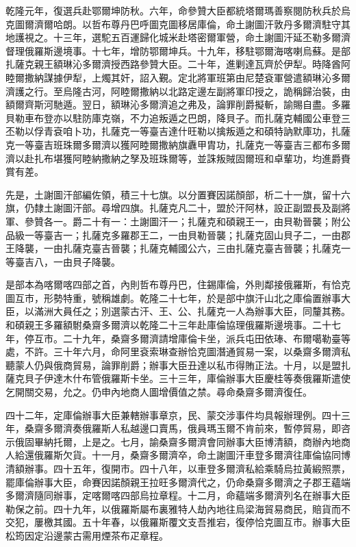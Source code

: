 \begin{pinyinscope}
乾隆元年，復選兵赴鄂爾坤防秋。六年，命參贊大臣都統塔爾瑪善察閱防秋兵於烏克圖爾濟爾哈朗。以哲布尊丹巴呼圖克圖移居庫倫，命土謝圖汗敦丹多爾濟駐守其地護視之。十三年，選駝五百運歸化城米赴塔密爾軍營，命土謝圖汗延丕勒多爾濟督理俄羅斯邊境事。十七年，增防鄂爾坤兵。十九年，移駐鄂爾海喀喇烏蘇。是部扎薩克親王額琳沁多爾濟授西路參贊大臣。二十年，進剿達瓦齊於伊犁。時降酋阿睦爾撒納謀據伊犁，上燭其奸，詔入覲。定北將軍班第由尼楚袞軍營遣額琳沁多爾濟護之行。至烏隆古河，阿睦爾撒納以北路定邊左副將軍印授之，詭稱歸治裝，由額爾齊斯河馳遁。翌日，額琳沁多爾濟追之弗及，論罪削爵擬斬，諭賜自盡。多羅貝勒車布登亦以駐防庫克嶺，不力追叛遁之巴朗，降貝子。而扎薩克輔國公車登三丕勒以俘青袞咱卜功，扎薩克一等臺吉達什旺勒以擒叛遁之和碩特訥默庫功，扎薩克一等臺吉班珠爾多爾濟以獲阿睦爾撒納旗纛甲胄功，扎薩克一等臺吉三都布多爾濟以赴扎布堪獲阿睦納撒納之孥及班珠爾等，並誅叛賊固爾班和卓輩功，均進爵賚賞有差。

先是，土謝圖汗部編佐領，積三十七旗。以分置賽因諾顏部，析二十一旗，留十六旗，仍隸土謝圖汗部。尋增四旗。扎薩克凡二十，盟於汗阿林，設正副盟長及副將軍、參贊各一。爵二十有一：土謝圖汗一；扎薩克和碩親王一，由貝勒晉襲；附公品級一等臺吉一；扎薩克多羅郡王二，一由貝勒晉襲；扎薩克固山貝子二，一由郡王降襲，一由扎薩克臺吉晉襲；扎薩克輔國公六，三由扎薩克臺吉晉襲；扎薩克一等臺吉八，一由貝子降襲。

是部本為喀爾喀四部之首，內則哲布尊丹巴，住錫庫倫，外則鄰接俄羅斯，有恰克圖互市，形勢特重，號稱雄劇。乾隆二十七年，於是部中旗汗山北之庫倫置辦事大臣，以滿洲大員任之；別選蒙古汗、王、公、扎薩克一人為辦事大臣，同釐其務。和碩親王多羅額駙桑齋多爾濟以乾隆二十三年赴庫倫協理俄羅斯邊境事。二十七年，停互市。二十九年，桑齋多爾濟請增庫倫卡坐，派兵屯田依琫、布爾噶勒臺等處，不許。三十年六月，命阿里袞索琳查辦恰克圖潛通貿易一案，以桑齋多爾濟私聽蒙人仍與俄商貿易，論罪削爵；辦事大臣丑達以私市得賄正法。十月，以是盟扎薩克貝子伊達木什布管俄羅斯卡坐。三十三年，庫倫辦事大臣慶桂等奏俄羅斯遣使乞開關交易，允之。仍申內地商人圖增價值之禁。尋命桑齋多爾濟復任。

四十二年，定庫倫辦事大臣兼轄辦事章京，民、蒙交涉事件均具報辦理例。四十三年，桑齋多爾濟奏俄羅斯人私越邊口賣馬，俄員瑪玉爾不肯前來，暫停貿易，即咨示俄固畢納托爾，上是之。七月，諭桑齋多爾濟會同辦事大臣博清額，商辦內地商人給還俄羅斯欠貨。十一月，桑齋多爾濟卒，命土謝圖汗車登多爾濟往庫倫協同博清額辦事。四十五年，復開市。四十八年，以車登多爾濟私給乘騎烏拉黃緞照票，罷庫倫辦事大臣，命賽因諾顏親王拉旺多爾濟代之，仍命桑齋多爾濟之子郡王蘊端多爾濟隨同辦事，定喀爾喀四部烏拉章程。十二月，命蘊端多爾濟列名在辦事大臣勒保之前。四十九年，以俄羅斯屬布裏雅特人劫內地往烏梁海貿易商民，賠貨而不交犯，屢檄其國。五十年春，以俄羅斯覆文支吾推宕，復停恰克圖互市。辦事大臣松筠因定沿邊蒙古需用煙茶布疋章程。


\end{pinyinscope}
